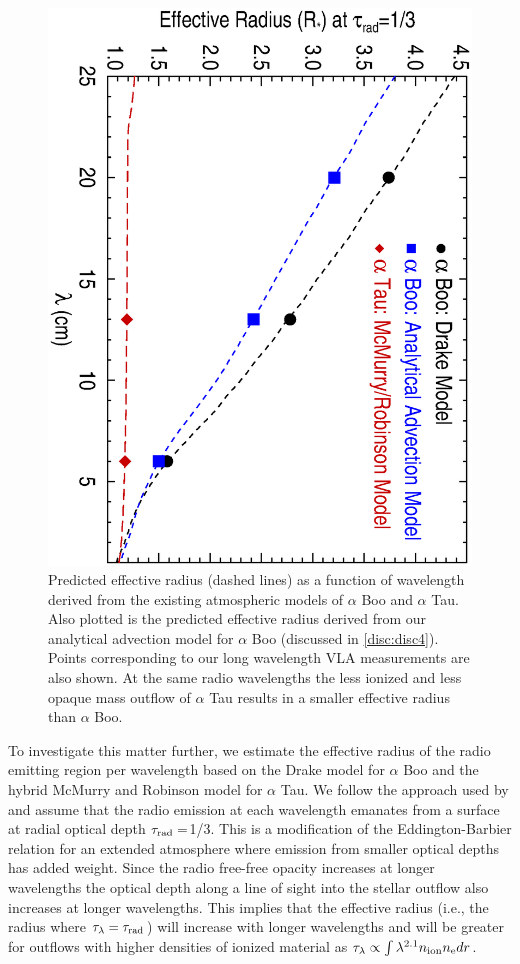 \documentclass[iop]{emulateapj}
\begin{document}
\begin{figure}
\includegraphics[trim = 5mm 10mm 10mm 20mm, clip,scale=0.4,angle=90]{fig5.ps}
\caption{Predicted effective radius (dashed lines) as a function of wavelength derived from the existing atmospheric models of $\alpha$ Boo and $\alpha$ Tau.  Also plotted is the predicted effective radius derived from our analytical advection model for $\alpha$ Boo (discussed in \ref{disc:disc4}). Points corresponding to our long wavelength VLA measurements are also shown. At the same radio wavelengths the less ionized and less opaque mass outflow of $\alpha$ Tau results in a smaller effective radius than $\alpha$ Boo.}
\label{fig:fig5}
\end{figure}

To investigate this matter further,  we estimate the effective radius of the radio emitting region per wavelength based on the Drake model for $\alpha$ Boo and the hybrid McMurry and Robinson model for $\alpha$ Tau. We follow the approach used by \cite{1977ApJ...212..488C} and assume that the radio emission at each wavelength emanates from a surface at radial optical depth $\tau _{\rm{rad}}=$1/3. This is a modification of the Eddington-Barbier relation for an extended atmosphere where emission from smaller optical depths has added weight. Since the radio free-free opacity increases at longer wavelengths the optical depth along a line of sight into the stellar outflow also increases at longer wavelengths. This implies that the effective radius (i.e., the radius where $\tau _{\lambda} = \tau _{\rm{rad}}$) will increase with longer wavelengths and will be greater for outflows with higher densities of ionized material as $\tau _{\lambda} \propto \int \lambda ^{2.1}n_{\rm{ion}}n_{\rm{e}} dr$. 
\end{document}

